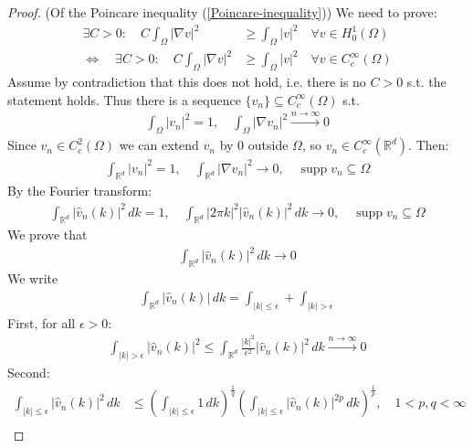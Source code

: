 \documentclass{report}
\theoremstyle{tommy}
\newcommand{\supp}{\operatorname{supp}}
\begin{document}
  \begin{proof}(Of the Poincare inequality (\ref{Poincare-inequality}))
    We need to prove: 
    \begin{align*}
      \exists C > 0: \quad C \int_\Omega |\nabla v|^2 &\ge \int_\Omega |v|^2 \quad \forall v \in H_0^1(\Omega)\\
      \Leftrightarrow \quad \exists C > 0: \quad C \int_\Omega |\nabla v|^2 &\ge \int_\Omega |v|^2 \quad \forall v \in C_c^\infty(\Omega)
    \end{align*}
    Assume by contradiction that this does not hold, i.e. there is no \(C > 0\) s.t. the statement holds. Thus there is a sequence \(\{v_n\} \subseteq C_c^\infty(\Omega)\) s.t. 
    \begin{align*}
      \int_\Omega |v_n|^2 = 1, \quad
      \int_\Omega |\nabla v_n |^2 \xrightarrow{n \to \infty} 0
    \end{align*}
    Since \(v_n \in C_c^2(\Omega)\) we can extend \(v_n\) by \(0\) outside \(\Omega\), so \(v_n \in C_c^\infty(\mathbb{R}^d)\). Then:
    \begin{align*}
      \int_{\mathbb{R}^d}|v_n|^2 = 1, \quad \int_{\mathbb{R}^d} |\nabla v_n|^2 \to 0, \quad \supp v_n \subseteq \Omega
    \end{align*}
    By the Fourier transform:
    \begin{align*}
      \int_{\mathbb{R}^d} |\hat v_n(k)|^2 \, dk = 1, \quad 
      \int_{\mathbb{R}^d} |2 \pi k|^2 |\hat v_n(k)|^2 \, dk \to 0, \quad 
      \supp v_n \subseteq \Omega  
    \end{align*}
    We prove that
    \begin{align*}
      \int_{\mathbb{R}^d} |\hat v_n(k)|^2 \, dk \to 0
    \end{align*}
    We write
    \begin{align*}
      \int_{\mathbb{R}^d} |\hat v_n(k)| \, dk = \int_{|k| \le \epsilon} + \int_{|k| > \epsilon}
    \end{align*}
    First, for all \(\epsilon > 0\):
    \begin{align*}
      \int_{|k|> \epsilon} |\hat v_n(k)|^2 \le \int_{\mathbb{R}^d} \frac{|k|^2}{\epsilon^2} |\hat v_n(k)|^2 \, dk \xrightarrow{n \to \infty} 0
    \end{align*}
    Second:
    \begin{align*}
      \int_{|k|\le \epsilon} |\hat v_n(k)|^2 \, dk 
      &\le \left(\int_{|k| \le \epsilon} 1 \, dk\right)^{\frac{1}{q}} \left(\int_{|k|\le \epsilon} |\hat v_n(k)|^{2p} \, dk\right)^{\frac{1}{p}}, \quad 1 < p,q < \infty \\

\end{align*}
\end{proof}
\end{document}
